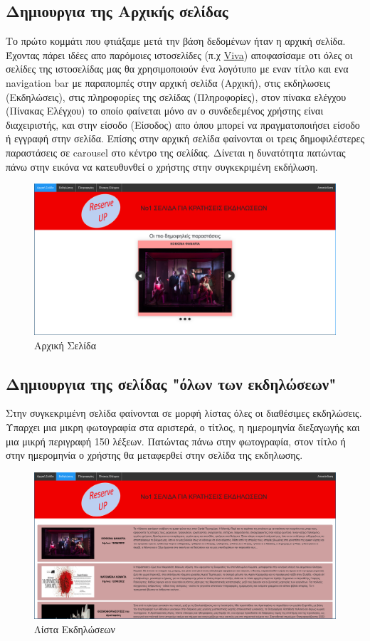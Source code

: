 \documentclass{acmart}
\begin{document}
\subsection*{Δημιουργια της Αρχικής σελίδας}
Το πρώτο κομμάτι που φτιάξαμε μετά την βάση δεδομένων ήταν η αρχική σελίδα. 
Έχοντας πάρει ιδέες απο παρόμοιες ιστοσελίδες (π.χ \href{www.viva.gr}{Viva}) 
αποφασίσαμε οτι όλες οι σελίδες της ιστοσελίδας μας θα χρησιμοποιούν ένα λογότυπο 
με εναν τίτλο και ενα navigation bar με παραπομπές στην αρχική σελίδα (Αρχική), στις 
εκδηλωσεις (Εκδηλώσεις), στις πληροφορίες της σελίδας (Πληροφορίες), στον πίνακα ελέγχου 
(Πίνακας Ελέγχου) το οποίο φαίνεται μόνο αν ο συνδεδεμένος χρήστης είναι διαχειριστής, και στην είσοδο 
(Είσοδος) απο όπου μπορεί να πραγματοποιήσει είσοδο ή εγγραφή στην σελίδα. Επίσης στην αρχική σελίδα φαίνονται 
οι τρεις δημοφιλέστερες παραστάσεις σε carousel στο κέντρο της σελίδας. Δίνεται η δυνατότητα πατώντας πάνω στην 
εικόνα να κατευθυνθεί ο χρήστης στην συγκεκριμένη εκδήλωση.
\begin{figure}[H]
       \includegraphics[width=\textwidth]{homepage.png}
       \caption{Αρχική Σελίδα}
       \label{fig:home}
\end{figure}
\subsection*{Δημιουργια της σελίδας "όλων των εκδηλώσεων"}
Στην συγκεκριμένη σελίδα φαίνονται σε μορφή λίστας όλες οι διαθέσιμες εκδηλώσεις. Υπαρχει μια μικρη 
φωτογραφία στα αριστερά, ο τίτλος, η ημερομηνία διεξαγωγής και μια μικρή περιγραφή 150 λέξεων. Πατώντας 
πάνω στην φωτογραφία, στον τίτλο ή στην ημερομηνία ο χρήστης θα μεταφερθεί στην σελίδα της εκδηλωσης.
\begin{figure}[H]
       \includegraphics[width=\textwidth]{events.png}
       \caption{Λίστα Εκδηλώσεων}
       \label{fig:events}
\end{figure}
\end{document}
